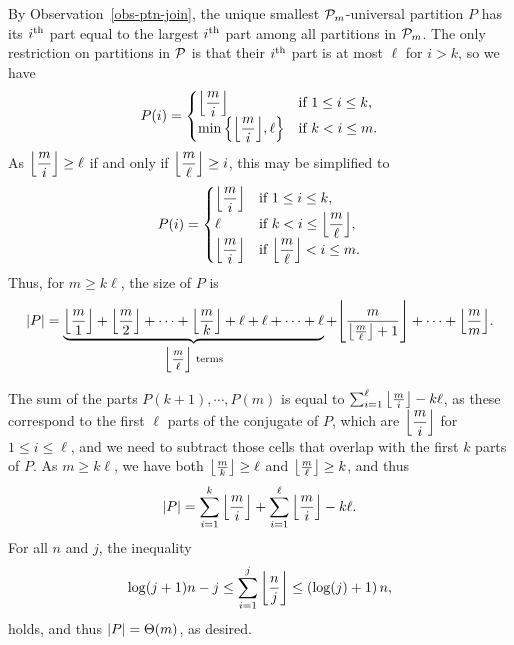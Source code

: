 \newenvironment{proof-of-thm-ptn-universal-proper}{%
	\medskip\noindent {\it Proof of Theorem~\ref{thm-ptn-universal-proper}.\/}%
}{%
	\qed\bigskip%
}
\begin{proof-of-thm-ptn-universal-proper}
	By Observation~\ref{obs-ptn-join}, the unique smallest $\P_m$-universal partition $P$ has its $i\th$ part equal to the largest $i\th$ part among all partitions in $\P_m$. The only restriction on partitions in $\P$ is that their $i\th$ part is at most $\ell$ for $i > k$, so we have
	\[
		P(i)
		=
		\begin{cases}
			\floor{\dfrac{m}{i}}                          & \text{if $1 \le i \le k$,} \\
			\min\left\{\floor{\dfrac{m}{i}}, \ell\right\} & \text{if $k  <  i \le m$.}
		\end{cases}
	\]
	As $\floor{\dfrac{m}{i}} \ge \ell$ if and only if $\floor{\dfrac{m}{\ell}} \ge i$, this may be simplified to
	\[
		P(i)
		=
		\begin{cases}
			\floor{\dfrac{m}{i}} & \text{if $1 \le i \le k$,} \\
			\ell                 & \text{if $k  <  i \le \floor{\dfrac{m}{\ell}}$,} \\
			\floor{\dfrac{m}{i}} & \text{if $\floor{\dfrac{m}{\ell}} < i \le m$.}
		\end{cases}
	\]
	Thus, for $m \ge k\ell$, the size of $P$ is
	\[
		\size{P} 
		= 
		\underbrace{\floor{\dfrac{m}{1}} + \floor{\dfrac{m}{2}} + \cdots + \floor{\dfrac{m}{k}} + \ell + \ell + \cdots + \ell}_{\text{$\floor{\dfrac{m}{\ell}}$ terms}} + \floor{\dfrac{m}{\floor{\tfrac{m}{\ell}}+1}} + \cdots + \floor{\dfrac{m}{m}}.
	\]

	The sum of the parts $P(k+1), \cdots, P(m)$ is equal to $\sum_{i = 1}^{\ell} \floor{\frac{m}{i}} - k\ell$, as these correspond to the first $\ell$ parts of the conjugate of $P$, which are $\floor{\dfrac{m}{i}}$ for $1 \le i \le \ell$, and we need to subtract those cells that overlap with the first $k$ parts of $P$. As $m \ge k\ell$, we have both $\floor{\frac{m}{k}} \ge \ell$ and $\floor{\frac{m}{\ell}} \ge k$, and thus
	\[
		\size{P}
		= 
		\sum_{i=1}^{k} \floor{\frac{m}{i}} + \sum_{i=1}^{\ell} \floor{\frac{m}{i}} - k\ell.
	\]
	For all $n$ and $j$, the inequality
	\[
		\log(j+1)n-j
		\le
		\sum_{i = 1}^{j} \floor{\frac{n}{j}} 
		\le 
		\left(\log(j)+1\right)n,
	\]
	holds, and thus $\size{P} = \oTheta{m}$, as desired.
\end{proof-of-thm-ptn-universal-proper}

